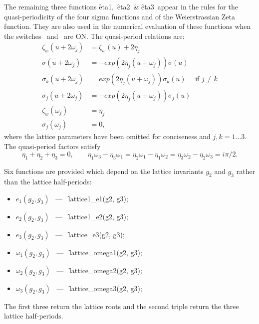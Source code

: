 \hypertarget{operator:ETA1}{}
\hypertarget{operator:ETA2}{}
\hypertarget{operator:ETA3}{}
The remaining three functions \f{eta1},\ \f{eta2}\ \& \f{eta3}\ appear in
the rules for the quasi-periodicity of the four sigma functions and of the
Weierstrassian Zeta function. They are also used in the numerical
evaluation of these functions when the switches \ and \
are ON. The quasi-period relations are:
\begin{align*}
  \zeta_w(u+2\omega_j) & = \zeta_w(u)+2\eta_j\\
  \sigma(u+2\omega_j) & = -exp(2\eta_j(u+\omega_j))\sigma(u)\\
  \sigma_k(u+2\omega_j) & =  exp(2\eta_j(u+\omega_j))\sigma_k(u) \quad\text{  if  }j\neq k\\
  \sigma_j(u+2\omega_j) & = -exp(2\eta_j(u+\omega_j))\sigma_j(u)\\
  \zeta_w(\omega_j) & = \eta_j\\
  \sigma_j(\omega_j) & = 0,
\end{align*}
where the lattice parameters have been omitted for conciseness and $j,k = 1\ldots 3$.
The quasi-period factors satisfy
\[\eta_1+\eta_2+\eta_3=0,\qquad
   \eta_1\omega_3-\eta_3\omega_1=\eta_2\omega_1-\eta_1\omega_2=\eta_3\omega_2-\eta_2\omega_3=i\pi/2.\]

Six functions are provided which depend on the lattice invariants $g_2$ and $g_3$ rather than the lattice
half-periods:
\begin{itemize}
\item $e_1(g_2, g_3)$ \ --- \ \f{lattice1\_e1(g2, g3)};
\item $e_2(g_2, g_3)$ \ --- \ \f{lattice1\_e2(g2, g3)};
\item $e_3(g_2, g_3)$ \ --- \ \f{lattice\_e3(g2, g3)};
\item $\omega_1(g_2,g_3)$ \ --- \ \f{lattice\_omega1(g2, g3)};
\item $\omega_2(g_2,g_3)$ \ --- \ \f{lattice\_omega2(g2, g3)};
\item $\omega_3(g_2,g_3)$ \ --- \ \f{lattice\_omega3(g2, g3)};
\end{itemize}
The first three return the lattice roots and the second triple return the
three lattice half-periods.

